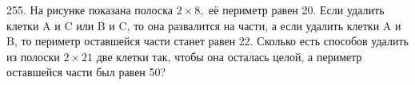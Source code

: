 255. На рисунке показана полоска $2\times 8,$ её периметр равен 20. Если удалить клетки A и C или B и C, то она развалится на части, а если удалить клетки A и B, то периметр оставшейся части станет равен 22. Сколько есть способов удалить из полоски $2\times 21$ две клетки так, чтобы она осталась целой, а периметр оставшейся части был равен 50?
\begin{figure}[ht!]
\end{figure}\\
